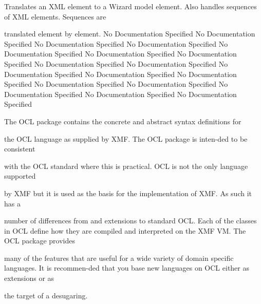       Translates an XML element to a Wizard model element.
      Also handles sequences of XML elements. Sequences are

      translated element by element.
No Documentation Specified
No Documentation Specified
No Documentation Specified
No Documentation Specified
No Documentation Specified
No Documentation Specified
No Documentation Specified
No Documentation Specified
No Documentation Specified
No Documentation Specified
No Documentation Specified
No Documentation Specified
No Documentation Specified
No Documentation Specified
No Documentation Specified
No Documentation Specified
No Documentation Specified

      The OCL package contains the concrete and abstract syntax definitions for

      the OCL language as supplied by XMF. The OCL package is inten-ded to be consistent

      with the OCL standard where this is practical. OCL is not the only language supported

      by XMF but it is used as the basis for the implementation of XMF. As such it has a

      number of differences from and extensions to standard OCL. Each of the classes in OCL 
      define how they are compiled and interpreted on the XMF VM. The OCL package provides

      many of the features that are useful for a wide variety of domain specific languages.
      It is recommen-ded that you base new languages on OCL either as extensions or as

      the target of a desugaring.

